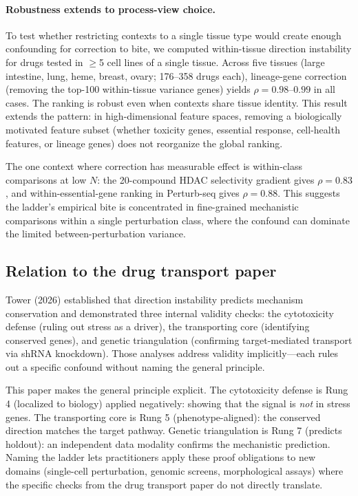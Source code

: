 \documentclass{article}
\begin{document}
\paragraph{Robustness extends to process-view choice.}
To test whether restricting contexts to a single tissue type would create
enough confounding for correction to bite, we computed within-tissue
direction instability for drugs tested in $\geq$5 cell lines of a single
tissue. Across five tissues (large intestine, lung, heme, breast, ovary;
176--358 drugs each), lineage-gene correction (removing the top-100
within-tissue variance genes) yields $\rho = 0.98$--$0.99$ in all cases.
The ranking is robust even when contexts share tissue identity. This
result extends the pattern: in high-dimensional feature spaces, removing
a biologically motivated feature subset (whether toxicity genes, essential
response, cell-health features, or lineage genes) does not reorganize the
global ranking.

The one context where correction has measurable effect is within-class
comparisons at low $N$: the 20-compound HDAC selectivity gradient gives
$\rho = 0.83$, and within-essential-gene ranking in Perturb-seq gives $\rho
= 0.88$. This suggests the ladder's empirical bite is concentrated in
fine-grained mechanistic comparisons within a single perturbation class,
where the confound can dominate the limited between-perturbation variance.

\subsection{Relation to the drug transport paper}

Tower (2026) established that direction instability predicts mechanism
conservation and demonstrated three internal validity checks: the cytotoxicity
defense (ruling out stress as a driver), the transporting core (identifying
conserved genes), and genetic triangulation (confirming target-mediated
transport via shRNA knockdown). Those analyses address validity implicitly---each
rules out a specific confound without naming the general principle.

This paper makes the general principle explicit. The cytotoxicity defense is
Rung 4 (localized to biology) applied negatively: showing that the signal is
\emph{not} in stress genes. The transporting core is Rung 5 (phenotype-aligned):
the conserved direction matches the target pathway. Genetic triangulation is
Rung 7 (predicts holdout): an independent data modality confirms the mechanistic
prediction. Naming the ladder lets practitioners apply these proof obligations
to new domains (single-cell perturbation, genomic screens, morphological
assays) where the specific checks from the drug transport paper do not
directly translate.
\end{document}
